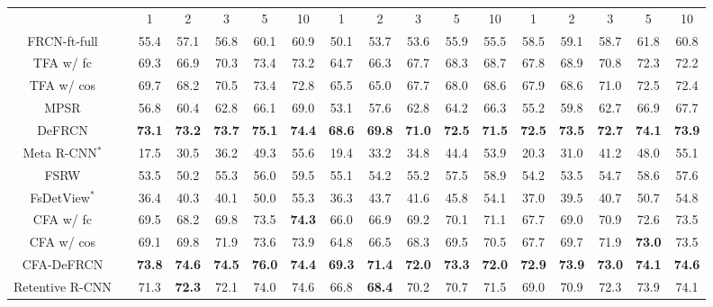 \documentclass[10pt,twocolumn,letterpaper]{article}
\newcommand{\cmark}{\ding{51}}\newcommand{\xmark}{\ding{55}}\newcommand\minisection[1]{\vspace{1mm}\noindent \textbf{#1}}
\newcommand{\best}[1]{\color{red}\textbf{#1}}
\newcommand{\second}[1]{\color{blue}\textbf{#1}}
\begin{document}
\begin{table*}
\begin{tabular}{c| c | c c c c c | c c c c c | c c c c c}
      & & 1 &  {2} & {3} & {5} &  {10} & 1 &  {2} & {3} & {5} &  {10} & 1 &  {2} & {3} & {5} &  {10} \\ \Xhline{1pt}
      FRCN-ft-full\cite{TFA} &\xmark & 55.4 & 57.1 & 56.8 & 60.1 & 60.9 & 50.1 & 53.7 & 53.6 & 55.9 & 55.5 & 58.5 & 59.1 & 58.7 & 61.8 & 60.8 \\
      TFA w/ fc\cite{TFA}&\xmark & 69.3 & 66.9 & 70.3 & 73.4 & 73.2 & 64.7 & 66.3 & 67.7 & 68.3 & 68.7 & 67.8 & 68.9 & 70.8 & 72.3 & 72.2 \\
      TFA w/ cos\cite{TFA}&\xmark & 69.7 & 68.2 & 70.5 & 73.4 & 72.8 & 65.5 & 65.0 & 67.7 & 68.0 & 68.6 & 67.9 & 68.6 & 71.0 & 72.5 & 72.4 \\
      MPSR\cite{MPSR}&\xmark & 56.8 & 60.4 & 62.8 & 66.1 & 69.0 &
       53.1 & 57.6 & 62.8 & 64.2 & 66.3 & 55.2 & 59.8 & 62.7 & 66.9 & 67.7 \\
      DeFRCN\cite{defrcn}&\xmark & \second{73.1} & \second{73.2} & \second{73.7} & \second{75.1} & \best{74.4} &
      \second{68.6} & \second{69.8} & \second{71.0} & \second{72.5} & \second{71.5} & \second{72.5} & \second{73.5} & \second{72.7} & \best{74.1} & \second{73.9} \\
       Meta R-CNN$^{*}$\cite{MetaRCNN}&\xmark & 17.5 & 30.5 & 36.2 & 49.3 & 55.6 & 19.4 & 33.2 & 34.8 & 44.4 & 53.9 & 20.3 & 31.0 & 41.2 & 48.0 & 55.1 \\
       FSRW\cite{FSRW}&\xmark & 53.5 & 50.2 & 55.3 & 56.0 & 59.5 & 55.1 & 54.2 & 55.2 & 57.5 & 58.9 & 54.2 & 53.5 & 54.7 & 58.6 & 57.6 \\
       FsDetView$^*$\cite{FsDetView}&\xmark & 36.4 & 40.3 & 40.1 & 50.0 & 55.3 & 36.3 & 43.7 & 41.6 & 45.8 & 54.1 & 37.0 & 39.5 & 40.7 & 50.7 & 54.8 \\ \Xhline{1pt}
       \rowcolor[HTML]{EFEFEF}
        CFA w/ fc&\xmark & 69.5 & 68.2 & 69.8 & 73.5 & \second{74.3} & 66.0 & 66.9 & 69.2 & 70.1 & 71.1 & 67.7 & 69.0 & 70.9 & 72.6 & 73.5 \\
        \rowcolor[HTML]{EFEFEF}
        CFA w/ cos&\xmark & 69.1 & 69.8 & 71.9 & 73.6 & 73.9 & 64.8 & 66.5 & 68.3 & 69.5 & 70.5 & 67.7 & 69.7 & 71.9 & \second{73.0} & 73.5 \\
       \rowcolor[HTML]{EFEFEF}
        CFA-DeFRCN&\xmark & \best{73.8} & \best{74.6} & \best{74.5} & \best{76.0} & \best{74.4} & \best{69.3} & \best{71.4} & \best{72.0} & \best{73.3} & \best{72.0} & \best{72.9} & \best{73.9} & \best{73.0} & \best{74.1} & \best{74.6} \\ \midrule[1.5pt]
       Retentive R-CNN\cite{gfsod}&\cmark & 71.3 & \second{72.3} & 72.1 & 74.0 & 74.6 & 66.8 & \second{68.4} & 70.2 & 70.7 & 71.5 & 69.0 & 70.9 & 72.3 & 73.9 & 74.1 \\

\end{tabular}
\end{table*}
\end{document}
